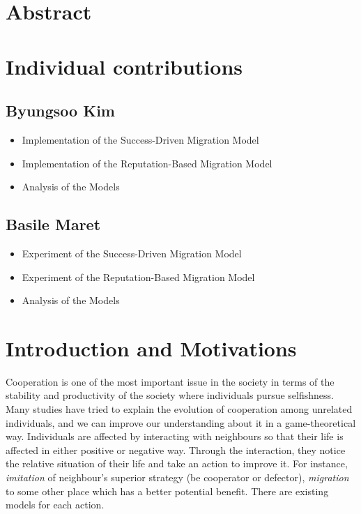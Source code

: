\documentclass[11pt]{article}
\begin{document}
\newpage




\section{Abstract}

\newpage
\section{Individual contributions}
\subsection{Byungsoo Kim}
\begin{itemize}
\item Implementation of the Success-Driven Migration Model
\item Implementation of the Reputation-Based Migration Model
\item Analysis of the Models
\end{itemize}

\subsection{Basile Maret}
\begin{itemize}
\item Experiment of the Success-Driven Migration Model
\item Experiment of the Reputation-Based Migration Model
\item Analysis of the Models
\end{itemize}

\newpage
\section{Introduction and Motivations}

Cooperation is one of the most important issue in the society in terms of the stability and productivity of the society where individuals pursue selfishness. Many studies have tried to explain the evolution of cooperation among unrelated individuals, and we can improve our understanding about it in a game-theoretical way. Individuals are affected by interacting with neighbours so that their life is affected in either positive or negative way. Through the interaction, they notice the relative situation of their life and take an action to improve it. For instance, \textit{imitation} of neighbour's superior strategy (be cooperator or defector), \textit{migration} to some other place which has a better potential benefit. There are existing models for each action.
\end{document}
